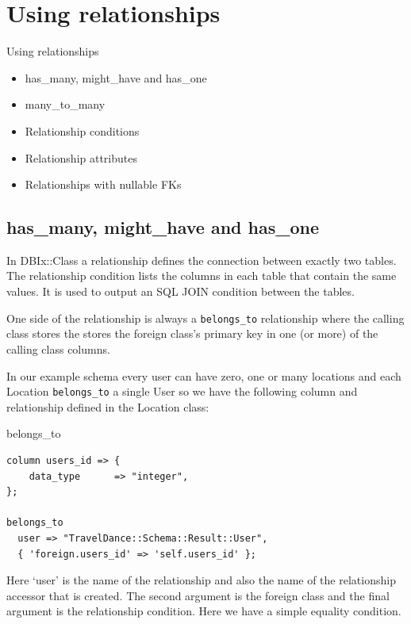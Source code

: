\section{Using relationships}

\begin{frame}{Using relationships}
\begin{itemize}
\item has\_many, might\_have and has\_one
\item many\_to\_many
\item Relationship conditions
\item Relationship attributes
\item Relationships with nullable FKs
\end{itemize}
\end{frame}

\subsection{has\_many, might\_have and has\_one}

In DBIx::Class a relationship defines the connection between exactly two
tables. The relationship condition lists the columns in each table that
contain the same values. It is used to output an SQL JOIN condition between
the tables.

One side of the relationship is always a \verb|belongs_to| relationship
where the calling class stores the stores the foreign class’s primary key in
one (or more) of the calling class columns.

In our example schema every user can have zero, one or many locations and
each Location \verb|belongs_to| a single User so we have the following column and
relationship defined in the Location class: 
 
\begin{frame}[fragile]{belongs\_to}
\begin{lstlisting}
column users_id => {
    data_type      => "integer",
};

belongs_to
  user => "TravelDance::Schema::Result::User",
  { 'foreign.users_id' => 'self.users_id' };
\end{lstlisting}
\end{frame}

Here ‘user’ is the name of the relationship and also the name of the relationship accessor that is created. The second argument is the foreign class and the final argument is the relationship condition. Here we have a simple equality condition.

